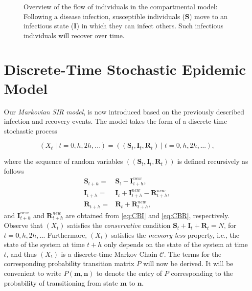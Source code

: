 \documentclass[a4paper,preprint]{elsarticle}
\renewcommand{\vec}[1]{\boldsymbol{#1}}
\begin{document}
\begin{figure}[t]
  \centering
\caption{Overview of the flow of individuals in the compartmental model:
Following a disease infection, susceptible individuals ($\vec{S}$) move to an
infectious state ($\vec{I}$) in which they can infect others. Such infectious
individuals will recover over time.}
\label{fig:flow_diagram}
\end{figure}

\section{Discrete-Time Stochastic Epidemic Model}

Our \textit{Markovian SIR model}, is now introduced based on the previously described infection and recovery events. The model takes the form of a discrete-time stochastic process 

\begin{equation}
\label{eq:MarkovianSIR}
  (X_{t} \mid t=0,h,2h,\ldots)=((\vec{S}_{t}, \vec{I}_{t}, \vec{R}_{t}) \mid t=0,h,2h,\ldots),  
\end{equation}

where the sequence of random variables $((\vec{S}_{t}, \vec{I}_{t}, \vec{R}_{t}))$ is defined recursively as follows
\begin{align}
\label{eq:difference_equations}
    \vec{S}_{t+h} = {} & \vec{S}_{t} - \vec{I}_{t+h}^{new}, \\
    \vec{I}_{t+h} = {} & \vec{I}_{t} + \vec{I}_{t+h}^{new} - \vec{R}_{t+h}^{new}, \\
    \vec{R}_{t+h} = {} & \vec{R}_{t} + \vec{R}_{t+h}^{new}, 
\label{eq:difference_equations_again}
\end{align}
%
and $\vec{I}_{t+h}^{new}$ and $\vec{R}_{t+h}^{new}$ are obtained from \eqref{eq:CBI} and \eqref{eq:CBR}, respectively. Observe that $(X_{t})$ satisfies the \textit{conservative} condition $\vec{S}_t+\vec{I}_t+\vec{R}_t=N$, for $t=0,h,2h,\ldots$ Furthermore, $(X_{t})$ satisfies the \textit{memory-less} property, i.e., the state of the system at time $t+h$ only depends on the state of the system at time $t$, and thus $(X_{t})$ is a discrete-time Markov Chain $\mathcal{C}$. The terms for the corresponding
probability transition matrix $P$ will now be derived. It will be convenient to write $P(\vec{m},\vec{n})$ to denote the entry of $P$ corresponding to the probability of transitioning from state $\vec{m}$ to $\vec{n}$.
\end{document}
